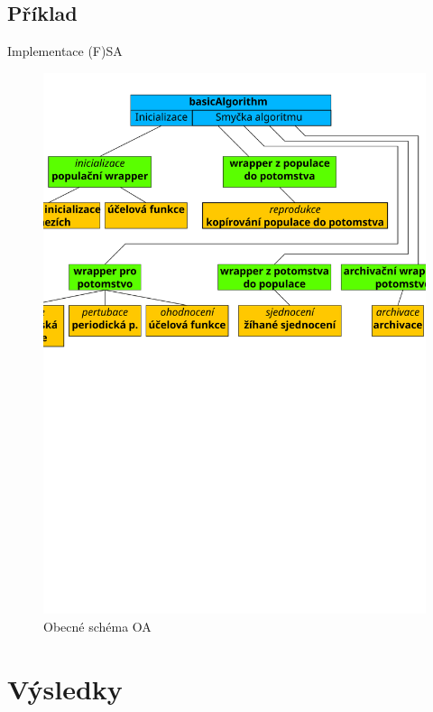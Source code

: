 \documentclass[compress,mathserif]{beamer}
\theoremstyle{definition}
\theoremstyle{plain}
\begin{document}
\subsection{Příklad}
    \begin{frame}{Implementace (F)SA}
        \begin{figure}[h!]
        \begin{center}
        \includegraphics[width=\textwidth]{img/SA}
        \caption{Obecné schéma OA}
        \end{center}
        \end{figure}
     \end{frame}



\section{Výsledky}
\end{document}
